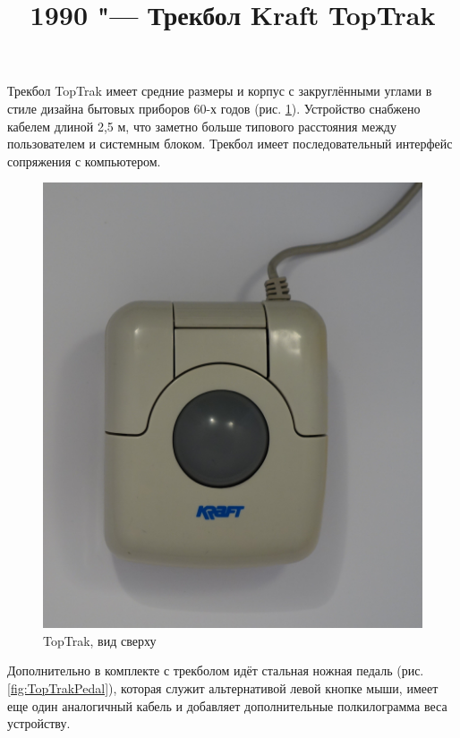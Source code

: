 \documentclass[11pt, a4paper]{article}
\begin{document}
\title{1990 "--- Трекбол Kraft TopTrak}

\maketitle

Трекбол TopTrak имеет средние размеры и корпус с закруглёнными углами в стиле дизайна бытовых приборов 60-х годов (рис. \ref{fig:TopTrakTop}). Устройство снабжено кабелем длиной 2,5 м, что заметно больше типового расстояния между пользователем и системным блоком. Трекбол имеет последовательный интерфейс сопряжения с компьютером.

\begin{figure}[h]
    \centering
    \includegraphics[scale=0.55]{1990_kraft_toptrack/2.9.jpg}
    \caption{TopTrak, вид сверху}
    \label{fig:TopTrakTop}
\end{figure}

Дополнительно в комплекте с трекболом идёт стальная ножная педаль (рис. \ref{fig:TopTrakPedal}), которая служит альтернативой левой кнопке мыши, имеет еще один аналогичный кабель и добавляет дополнительные полкилограмма веса устройству.
\end{document}

